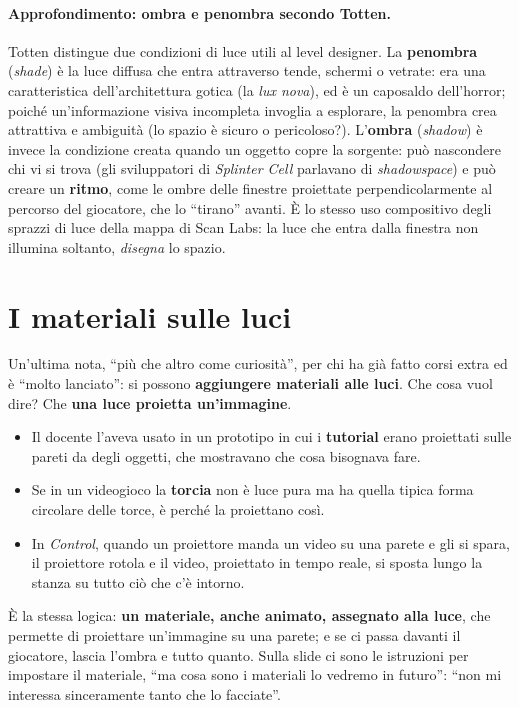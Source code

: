 \paragraph{Approfondimento: ombra e penombra secondo Totten.} Totten distingue due
condizioni di luce utili al level designer. La \textbf{penombra} (\emph{shade}) è la
luce diffusa che entra attraverso tende, schermi o vetrate: era una caratteristica
dell'architettura gotica (la \emph{lux nova}), ed è un caposaldo dell'horror; poiché
un'informazione visiva incompleta invoglia a esplorare, la penombra crea attrattiva
e ambiguità (lo spazio è sicuro o pericoloso?). L'\textbf{ombra} (\emph{shadow}) è
invece la condizione creata quando un oggetto copre la sorgente: può nascondere chi
vi si trova (gli sviluppatori di \emph{Splinter Cell} parlavano di
\emph{shadowspace}) e può creare un \textbf{ritmo}, come le ombre delle finestre
proiettate perpendicolarmente al percorso del giocatore, che lo ``tirano'' avanti. È
lo stesso uso compositivo degli sprazzi di luce della mappa di Scan Labs: la luce che
entra dalla finestra non illumina soltanto, \emph{disegna} lo spazio.

\section{I materiali sulle luci}
\label{gd14:sec:lightfn}

Un'ultima nota, ``più che altro come curiosità'', per chi ha già fatto corsi extra
ed è ``molto lanciato'': si possono \textbf{aggiungere materiali alle luci}. Che cosa
vuol dire? Che \textbf{una luce proietta un'immagine}.
\begin{itemize}
  \item Il docente l'aveva usato in un prototipo in cui i \textbf{tutorial} erano
        proiettati sulle pareti da degli oggetti, che mostravano che cosa bisognava
        fare.
  \item Se in un videogioco la \textbf{torcia} non è luce pura ma ha quella tipica
        forma circolare delle torce, è perché la proiettano così.
  \item In \emph{Control}, quando un proiettore manda un video su una parete e gli
        si spara, il proiettore rotola e il video, proiettato in tempo reale, si
        sposta lungo la stanza su tutto ciò che c'è intorno.
\end{itemize}
È la stessa logica: \textbf{un materiale, anche animato, assegnato alla luce}, che
permette di proiettare un'immagine su una parete; e se ci passa davanti il
giocatore, lascia l'ombra e tutto quanto. Sulla slide ci sono le istruzioni per
impostare il materiale, ``ma cosa sono i materiali lo vedremo in futuro'': ``non mi
interessa sinceramente tanto che lo facciate''.

